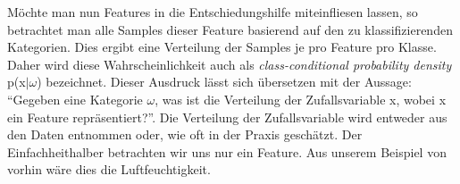 \documentclass[10pt, a4paper]{scrartcl}
\begin{document}
\bigskip\noindent
Möchte man nun Features in die Entschiedungshilfe miteinfliesen lassen, so betrachtet man alle Samples dieser Feature basierend auf
den zu klassifizierenden Kategorien. Dies ergibt eine Verteilung der Samples je pro Feature pro Klasse. Daher wird diese Wahrscheinlichkeit auch als 
\textit{class-conditional probability density} p(x$\mid$$\omega$) bezeichnet. Dieser Ausdruck lässt sich übersetzen mit der Aussage: ``Gegeben eine Kategorie $\omega$, was ist die Verteilung der Zufallsvariable x, wobei x ein Feature repräsentiert?''. Die Verteilung der Zufallsvariable wird entweder aus den Daten entnommen oder,
wie oft in der Praxis geschätzt. Der Einfachheithalber betrachten wir uns nur ein Feature. Aus unserem Beispiel von vorhin wäre dies die Luftfeuchtigkeit.
\end{document}
